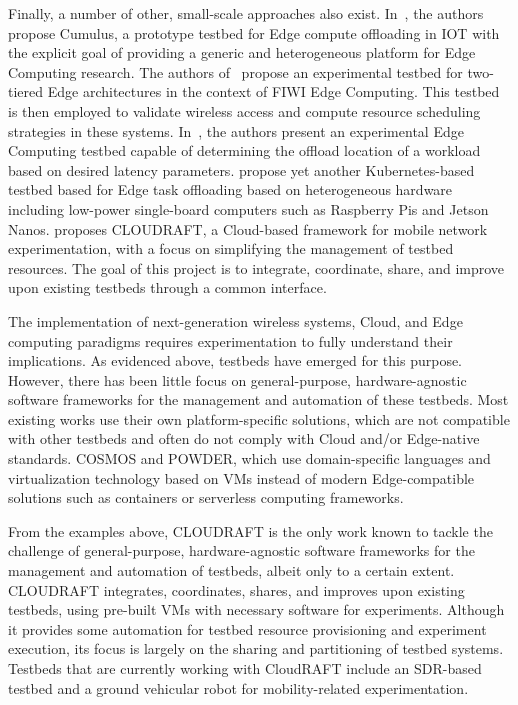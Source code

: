 Finally, a number of other, small-scale approaches also exist.
In~\cite{gedawy2016cumulus}, the authors propose Cumulus, a prototype testbed for Edge compute offloading in \gls{IOT} with the explicit goal of providing a generic and heterogeneous platform for Edge Computing research.
The authors of~\cite{rimal2018experimental} propose an experimental testbed for two-tiered Edge architectures in the context of \gls{FIWI} Edge Computing.
This testbed is then employed to validate wireless access and compute resource scheduling strategies in these systems.
In~\cite{yamanaka2021design}, the authors present an experimental Edge Computing testbed capable of determining the offload location of a workload based on desired latency parameters.
\cite{diao2019scalable} propose yet another Kubernetes-based testbed based for Edge task offloading based on heterogeneous hardware including low-power single-board computers such as Raspberry Pis and Jetson Nanos.\@
\cite{moorthy2022cloudraft} proposes \gls{CLOUDRAFT}, a Cloud-based framework for mobile network experimentation, with a focus on simplifying the management of testbed resources.
The goal of this project is to integrate, coordinate, share, and improve upon existing testbeds through a common interface.

\medskip

The implementation of next-generation wireless systems, Cloud, and Edge computing paradigms requires experimentation to fully understand their implications.
As evidenced above, testbeds have emerged for this purpose.
However, there has been little focus on general-purpose, hardware-agnostic software frameworks for the management and automation of these testbeds.
Most existing works use their own platform-specific solutions, which are not compatible with other testbeds and often do not comply with Cloud and/or Edge-native standards.
\gls{COSMOS} and \gls{POWDER}, which use domain-specific languages and virtualization technology based on \glspl{VM} instead of modern Edge-compatible solutions such as containers or serverless computing frameworks.

From the examples above, \gls{CLOUDRAFT} is the only work known to tackle the challenge of general-purpose, hardware-agnostic software frameworks for the management and automation of testbeds, albeit only to a certain extent.
\gls{CLOUDRAFT} integrates, coordinates, shares, and improves upon existing testbeds, using pre-built VMs with necessary software for experiments.
Although it provides some automation for testbed resource provisioning and experiment execution, its focus is largely on the sharing and partitioning of testbed systems.
Testbeds that are currently working with CloudRAFT include an SDR-based testbed and a ground vehicular robot for mobility-related experimentation.

